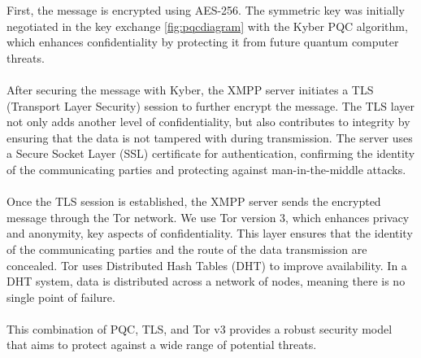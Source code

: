 First, the message is encrypted using AES-256. The symmetric key was initially negotiated in the key exchange \ref{fig:pqcdiagram} with the Kyber PQC algorithm, which enhances confidentiality by protecting it from future quantum computer threats.\\ \\
After securing the message with Kyber, the XMPP server initiates a TLS (Transport Layer Security) session to further encrypt the message. The TLS layer not only adds another level of confidentiality, but also contributes to integrity by ensuring that the data is not tampered with during transmission. The server uses a Secure Socket Layer (SSL) certificate for authentication, confirming the identity of the communicating parties and protecting against man-in-the-middle attacks. \\ \\
Once the TLS session is established, the XMPP server sends the encrypted message through the Tor network. We use Tor version 3, which enhances privacy and anonymity, key aspects of confidentiality. This layer ensures that the identity of the communicating parties and the route of the data transmission are concealed. Tor uses Distributed Hash Tables (DHT) to improve availability. In a DHT system, data is distributed across a network of nodes, meaning there is no single point of failure. \\ \\
This combination of PQC, TLS, and Tor v3 provides a robust security model that aims to protect against a wide range of potential threats. \\

